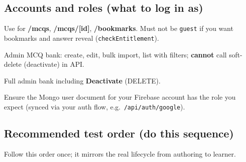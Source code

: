 \documentclass[11pt,a4paper]{article}
\begin{document}
\subsection{Accounts and roles (what to log in as)}

\begin{description}[style=nextline]
  \item[Student / mentor / etc.] Use for \textbf{/mcqs}, \textbf{/mcqs/[id]}, \textbf{/bookmarks}. Must not be \texttt{guest} if you want bookmarks and answer reveal (\texttt{checkEntitlement}).
  \item[\texttt{contentManager}] Admin MCQ bank: create, edit, bulk import, list with filters; \textbf{cannot} call soft-delete (deactivate) in API.
  \item[\texttt{admin} or \texttt{superAdmin}] Full admin bank including \textbf{Deactivate} (DELETE).
\end{description}
Ensure the Mongo user document for your Firebase account has the role you expect (synced via your auth flow, e.g.\ \texttt{/api/auth/google}).

\subsection{Recommended test order (do this sequence)}

Follow this order once; it mirrors the real lifecycle from authoring to learner.
\end{document}
